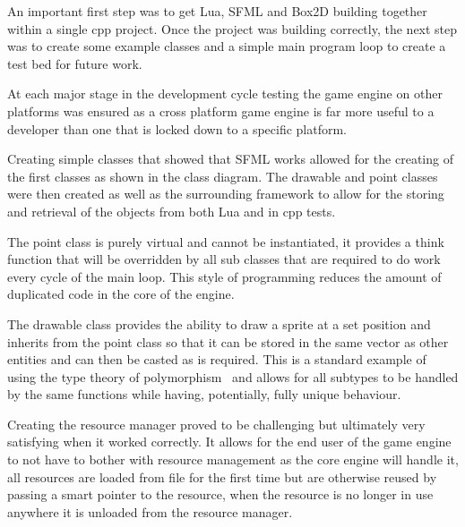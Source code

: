 \documentclass[11pt,a4paper,titlepage]{article}
\begin{document}
    
    
    An important first step was to get Lua, SFML and Box2D building together within a single cpp project. Once the project was building correctly, the next step was to create some example classes and a simple main program loop to create a test bed for future work.

    At each major stage in the development cycle testing the game engine on other platforms was ensured as a cross platform game engine is far more useful to a developer than one that is locked down to a specific platform.

    
    Creating simple classes that showed that SFML works allowed for the creating of the first classes as shown in the class diagram. The drawable and point classes were then created as well as the surrounding framework to allow for the storing and retrieval of the objects from both Lua and in cpp tests.

    The point class is purely virtual and cannot be instantiated, it provides a think function that will be overridden by all sub classes that are required to do work every cycle of the main loop. This style of programming reduces the amount of duplicated code in the core of the engine.

    The drawable class provides the ability to draw a sprite at a set position and inherits from the point class so that it can be stored in the same vector as other entities and can then be casted as is required. This is a standard example of using the type theory of polymorphism~\cite{PolymorphismDef} and allows for all subtypes to be handled by the same functions while having, potentially, fully unique behaviour.


    Creating the resource manager proved to be challenging but ultimately very satisfying when it worked correctly. It allows for the end user of the game engine to not have to bother with resource management as the core engine will handle it, all resources are loaded from file for the first time but are otherwise reused by passing a smart pointer to the resource, when the resource is no longer in use anywhere it is unloaded from the resource manager.

\end{document}
